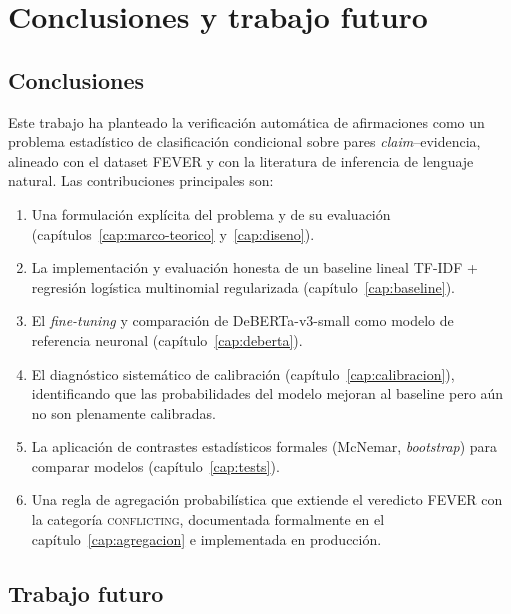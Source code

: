 \chapter{Conclusiones y trabajo futuro}\label{cap:conclusiones}

\section{Conclusiones}

Este trabajo ha planteado la verificación automática de afirmaciones
como un problema estadístico de clasificación condicional sobre pares
\emph{claim}--evidencia, alineado con el dataset FEVER y con la
literatura de inferencia de lenguaje natural. Las contribuciones
principales son:

\begin{enumerate}[leftmargin=*,itemsep=0.3em]
  \item Una formulación explícita del problema y de su evaluación
        (capítulos~\ref{cap:marco-teorico} y~\ref{cap:diseno}).
  \item La implementación y evaluación honesta de un baseline lineal
        TF-IDF + regresión logística multinomial regularizada
        (capítulo~\ref{cap:baseline}).
  \item El \emph{fine-tuning} y comparación de DeBERTa-v3-small como
        modelo de referencia neuronal (capítulo~\ref{cap:deberta}).
  \item El diagnóstico sistemático de calibración
        (capítulo~\ref{cap:calibracion}), identificando que las
        probabilidades del modelo mejoran al baseline pero aún no son
        plenamente calibradas.
  \item La aplicación de contrastes estadísticos formales (McNemar,
        \emph{bootstrap}) para comparar modelos
        (capítulo~\ref{cap:tests}).
  \item Una regla de agregación probabilística que extiende el
        veredicto FEVER con la categoría \textsc{conflicting},
        documentada formalmente en el capítulo~\ref{cap:agregacion} e
        implementada en producción.
\end{enumerate}

\section{Trabajo futuro}

